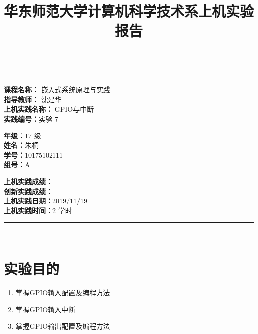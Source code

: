 \documentclass[a4paper,10pt,UTF8]{paper}
\title{华东师范大学计算机科学技术系上机实验报告}
\numberwithin{equation}{section}
\numberwithin{figure}{section}
\begin{document}
\pagestyle{fancy}
\lhead{}
\rhead{}
\makeatletter
\def\headrule{{\if@fancyplain\let\headrulewidth\plainheadrulewidth\fi%
\color{gray}\hrule\@height 0.2pt\@width\headwidth}
  \vspace{6mm}}
\makeatother

\newcommand{\HRule}{\rule{\linewidth}{1mm}}
\newcommand{\dai}{\textbf{Dais-CMX16$^+$}}

{ \\ [0.8cm]

\small{
  \begin{minipage}[t]{.32\linewidth}
    \textbf{课程名称：} 嵌入式系统原理与实践\\
    \textbf{指导教师：} 沈建华\\
    \textbf{上机实践名称：} GPIO与中断\\
    \textbf{实践编号：}实验 7
  \end{minipage}
  \begin{minipage}[t]{.32\linewidth}
    \textbf{年级：}17 级\\
    \textbf{姓名：}朱桐\\
    \textbf{学号：}10175102111\\
    \textbf{组号：}A
  \end{minipage} 
  \begin{minipage}[t]{.32\linewidth}
    \textbf{上机实践成绩：} \\
    \textbf{创新实践成绩：} \\
    \textbf{上机实践日期：}2019/11/19\\
    \textbf{上机实践时间：}2 学时\\
  \end{minipage}
}
\HRule \\[0.5cm]
}


\section{实验目的}

\begin{enumerate}
    \item 掌握GPIO输入配置及编程方法
    \item 掌握GPIO输入中断
    \item 掌握GPIO输出配置及编程方法
\end{enumerate}
\end{document}
